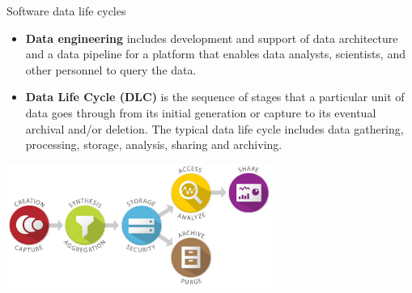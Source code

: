 \begin{frame}{Software data life cycles}%
    \begin{itemize}
        \item \textbf{Data engineering} includes development and support of data architecture and a data pipeline for a platform that enables data analysts, scientists, and other personnel to query the data.
        
        \item \textbf{Data Life Cycle (DLC)} is the sequence of stages that a particular unit of data goes through from its initial generation 
        or capture to its eventual archival and/or deletion. The typical data life cycle includes data gathering, processing, storage, analysis, sharing and archiving. 

    \end{itemize}
    \vspace{-1ex}
    \centering
    \includegraphics[width=0.65\textwidth]{pics/data_lifecycle_illust.jpg}
\end{frame}

